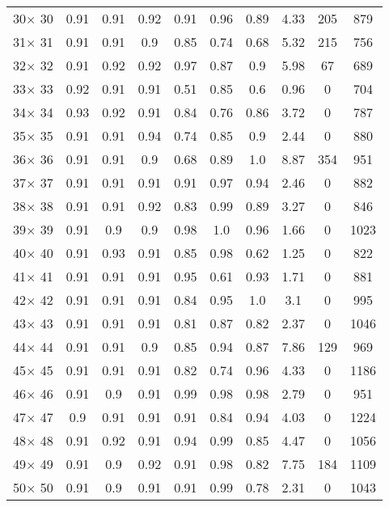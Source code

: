 \documentclass[main.tex]{subfiles}
\begin{document}
\begin{table}
\begin{tabular}{|c|c|c|c|c|c|c|c|c|c|}
30$\times$ 30 &0.91 &0.91 &0.92 &0.91 &0.96 &0.89 &4.33 &205 &879\\
31$\times$ 31 &0.91 &0.91 &0.9 &0.85 &0.74 &0.68 &5.32 &215 &756\\
32$\times$ 32 &0.91 &0.92 &0.92 &0.97 &0.87 &0.9 &5.98 &67 &689\\
33$\times$ 33 &0.92 &0.91 &0.91 &0.51 &0.85 &0.6 &0.96 &0 &704\\
34$\times$ 34 &0.93 &0.92 &0.91 &0.84 &0.76 &0.86 &3.72 &0 &787\\
35$\times$ 35 &0.91 &0.91 &0.94 &0.74 &0.85 &0.9 &2.44 &0 &880\\
36$\times$ 36 &0.91 &0.91 &0.9 &0.68 &0.89 &1.0 &8.87 &354 &951\\
37$\times$ 37 &0.91 &0.91 &0.91 &0.91 &0.97 &0.94 &2.46 &0 &882\\
38$\times$ 38 &0.91 &0.91 &0.92 &0.83 &0.99 &0.89 &3.27 &0 &846\\
39$\times$ 39 &0.91 &0.9 &0.9 &0.98 &1.0 &0.96 &1.66 &0 &1023\\
40$\times$ 40 &0.91 &0.93 &0.91 &0.85 &0.98 &0.62 &1.25 &0 &822\\
41$\times$ 41 &0.91 &0.91 &0.91 &0.95 &0.61 &0.93 &1.71 &0 &881\\
42$\times$ 42 &0.91 &0.91 &0.91 &0.84 &0.95 &1.0 &3.1 &0 &995\\
43$\times$ 43 &0.91 &0.91 &0.91 &0.81 &0.87 &0.82 &2.37 &0 &1046\\
44$\times$ 44 &0.91 &0.91 &0.9 &0.85 &0.94 &0.87 &7.86 &129 &969\\
45$\times$ 45 &0.91 &0.91 &0.91 &0.82 &0.74 &0.96 &4.33 &0 &1186\\
46$\times$ 46 &0.91 &0.9 &0.91 &0.99 &0.98 &0.98 &2.79 &0 &951\\
47$\times$ 47 &0.9 &0.91 &0.91 &0.91 &0.84 &0.94 &4.03 &0 &1224\\
48$\times$ 48 &0.91 &0.92 &0.91 &0.94 &0.99 &0.85 &4.47 &0 &1056\\
49$\times$ 49 &0.91 &0.9 &0.92 &0.91 &0.98 &0.82 &7.75 &184 &1109\\
50$\times$ 50 &0.91 &0.9 &0.91 &0.91 &0.99 &0.78 &2.31 &0 &1043\\
    \hline
    \end{tabular}
\end{table}
\end{document}
